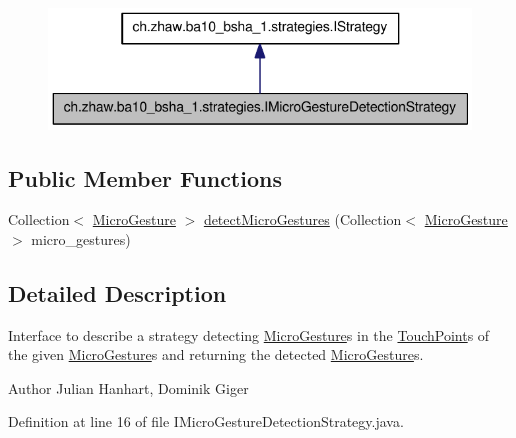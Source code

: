 \begin{figure}[H]
\begin{center}
\leavevmode
\includegraphics[width=344pt]{interfacech_1_1zhaw_1_1ba10__bsha__1_1_1strategies_1_1IMicroGestureDetectionStrategy__coll__graph}
\end{center}
\end{figure}
\subsection*{Public Member Functions}
\begin{DoxyCompactItemize}
\item 
Collection$<$ \hyperlink{classch_1_1zhaw_1_1ba10__bsha__1_1_1service_1_1MicroGesture}{MicroGesture} $>$ \hyperlink{interfacech_1_1zhaw_1_1ba10__bsha__1_1_1strategies_1_1IMicroGestureDetectionStrategy_a8593331fb67e5d4dc890d3db9f2d1b58}{detectMicroGestures} (Collection$<$ \hyperlink{classch_1_1zhaw_1_1ba10__bsha__1_1_1service_1_1MicroGesture}{MicroGesture} $>$ micro\_\-gestures)
\end{DoxyCompactItemize}


\subsection{Detailed Description}
Interface to describe a strategy detecting \hyperlink{}{MicroGesture}s in the \hyperlink{classch_1_1zhaw_1_1ba10__bsha__1_1_1TouchPoint}{TouchPoint}s of the given \hyperlink{}{MicroGesture}s and returning the detected \hyperlink{}{MicroGesture}s.

\begin{DoxyAuthor}{Author}
Julian Hanhart, Dominik Giger 
\end{DoxyAuthor}


Definition at line 16 of file IMicroGestureDetectionStrategy.java.

